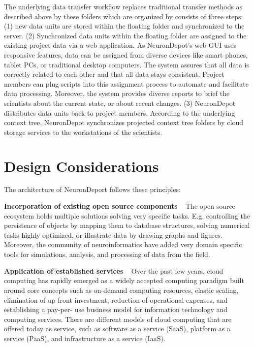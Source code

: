\documentclass{frontiersSCNS} %
\begin{document}
The underlying data transfer workflow replaces traditional transfer methods as
described above by these folders which are organized by consists of three
steps: (1) new data units are stored within the floating folder and
synchronized to the server. (2) Synchronized data units within the floating
folder are assigned to the existing project data via a web application. As
NeuronDepot's web GUI uses responsive features, data can be assigned from
diverse devices like smart phones, tablet PCs, or traditional desktop
computers. The system assures that all data is correctly related to each other
and that all data stays consistent. Project members can plug scripts into this
assignment process to automate and facilitate data processing. Moreover, the
system provides diverse reports to brief the scientists about the current
state, or about recent changes. (3) NeuronDepot distributes data units back to
project members. According to the underlying context tree, NeuronDepot
synchronizes projected context tree folders by cloud storage services to the
workstations of the scientists.


\section{Design Considerations}
The architecture of NeuronDeport follows these principles:

\textbf{Incorporation of existing open source components} \texttt{  } The open source ecosystem holds multiple solutions solving very specific tasks.
E.g. controlling the persistence of objects by mapping them to database
structures, solving numerical tasks highly optimized, or illustrate data by
drawing graphs and figures. Moreover, the community of neuroinformatics have
added  very domain specific tools for simulations, analysis, and processing of
data from the field.

\textbf{Application of established services} \texttt{  } Over the past few
years, cloud computing has rapidly emerged as a widely accepted computing
paradigm built around core concepts such as on-demand computing resources,
elastic scaling, elimination of up-front investment, reduction of operational
expenses, and establishing a pay-per- use business model for information
technology and computing services. There are different models of cloud
computing that are offered today as service, such as software as a service
(SaaS), platform as a service (PaaS), and infrastructure as a service (IaaS).
\end{document}
